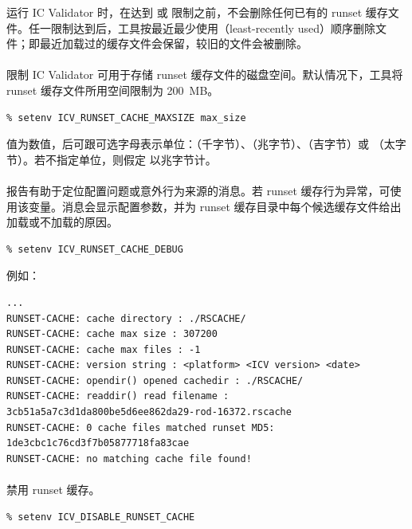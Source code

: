 运行 IC Validator 时，在达到  或  限制之前，不会删除任何已有的 runset 缓存文件。任一限制达到后，工具按最近最少使用（least-recently used）顺序删除文件；即最近加载过的缓存文件会保留，较旧的文件会被删除。

\paragraph{}
限制 IC Validator 可用于存储 runset 缓存文件的磁盘空间。默认情况下，工具将 runset 缓存文件所用空间限制为 200~MB。
\begin{lstlisting}
% setenv ICV_RUNSET_CACHE_MAXSIZE max_size
\end{lstlisting}

 值为数值，后可跟可选字母表示单位：（千字节）、（兆字节）、（吉字节）或 （太字节）。若不指定单位，则假定  以兆字节计。

\paragraph{}
报告有助于定位配置问题或意外行为来源的消息。若 runset 缓存行为异常，可使用该变量。消息会显示配置参数，并为 runset 缓存目录中每个候选缓存文件给出加载或不加载的原因。
\begin{lstlisting}
% setenv ICV_RUNSET_CACHE_DEBUG
\end{lstlisting}

例如：
\begin{lstlisting}
...
RUNSET-CACHE: cache directory : ./RSCACHE/
RUNSET-CACHE: cache max size : 307200
RUNSET-CACHE: cache max files : -1
RUNSET-CACHE: version string : <platform> <ICV version> <date>
RUNSET-CACHE: opendir() opened cachedir : ./RSCACHE/
RUNSET-CACHE: readdir() read filename :
3cb51a5a7c3d1da800be5d6ee862da29-rod-16372.rscache
RUNSET-CACHE: 0 cache files matched runset MD5:
1de3cbc1c76cd3f7b05877718fa83cae
RUNSET-CACHE: no matching cache file found!
\end{lstlisting}

\paragraph{}
禁用 runset 缓存。
\begin{lstlisting}
% setenv ICV_DISABLE_RUNSET_CACHE
\end{lstlisting}

